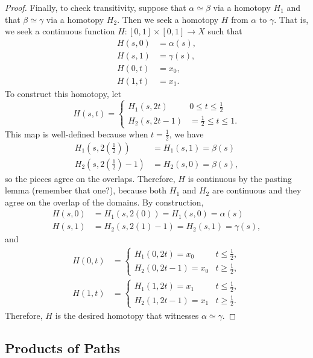 \documentclass[noname]{notes}
\begin{document}
\begin{proof}
	Finally, to check transitivity, suppose that $\alpha \simeq \beta$ via a homotopy $H_1$ and that $\beta \simeq \gamma$ via a homotopy $H_2$. Then we seek a homotopy $H$ from $\alpha$ to $\gamma$. That is, we seek a continuous function $H  \colon [0,1] \times [0,1] \to X$ such that 
	\begin{align*}
		H(s,0) &= \alpha(s),\\
		H(s,1) &= \gamma(s),\\
		H(0,t) &= x_0, \\
		H(1,t) &= x_1. 
	\end{align*}
	To construct this homotopy, let
	\[
		H(s,t) = 
		\begin{cases}
			H_1(s,2t) & 0 \leq t \leq \frac{1}{2} \\
			H_2(s,2t-1) &= \frac{1}{2} \leq t \leq 1. 
		\end{cases}
	\]
	This map is well-defined because when $t = \frac 1 2$, we have 
	\begin{align*}
		H_1(s,2(\tfrac{1}{2})) &= H_1(s,1) = \beta(s)\\
		H_2(s,2(\tfrac{1}{2}) - 1) &= H_2(s,0) = \beta(s), 
	\end{align*}
	so the pieces agree on the overlaps. Therefore, $H$ is continuous by the pasting lemma (remember that one?), because both $H_1$ and $H_2$ are continuous and they agree on the overlap of the domains. By construction, 
	\begin{align*}
		H(s,0) &= H_1(s,2(0)) = H_1(s,0) = \alpha(s)\\
		H(s,1) &= H_2(s,2(1) - 1) = H_2(s,1) = \gamma(s),
	\end{align*}
	and 
	\begin{align*}
		H(0,t) &= 
		\begin{cases}
			H_1(0,2t) = x_0 & t \leq \frac 1 2,\\
			H_2(0,2t-1) = x_0 & t \geq \frac 1 2,
		\end{cases}\\
		H(1,t) &= 
		\begin{cases}
			H_1(1,2t) = x_1 & t \leq \frac 1 2,\\[3mm]
			H_2(1,2t-1) = x_1 & t \geq \frac 1 2.
		\end{cases}
	\end{align*}
	Therefore, $H$ is the desired homotopy that witnesses $\alpha \simeq \gamma$. 
\end{proof}

\subsection{Products of Paths}
\end{document}
